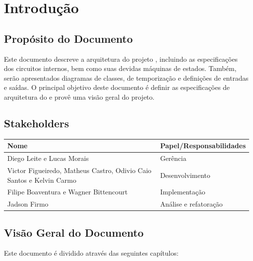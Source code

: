 \documentclass{report}
\begin{document}
\tableofcontents

\chapter{Introdução}
  
  \section{Propósito do Documento}
  Este documento descreve a arquitetura do projeto \ipPROCESSProject, incluindo as especificações dos circuitos internos, bem como suas devidas máquinas de estados. Também, serão apresentados diagramas de classes, de temporização e definições de entradas e saídas. O principal objetivo deste documento é definir as especificações de arquitetura do \ipPROCESSProject \space e provê uma visão geral do projeto.
  
  \section{Stakeholders}
    \FloatBarrier
    \begin{table}[H] 
      \begin{center}
        \begin{tabular}[pos]{|m{6cm} | m{8cm}|} 
          \hline 
          \cellcolor[gray]{0.9}\textbf{Nome} & \cellcolor[gray]{0.9}\textbf{Papel/Responsabilidades} \\ \hline
           Diego Leite e Lucas Morais & Gerência  \\ \hline
           Victor Figueiredo, Matheus Castro, Odivio Caio Santos e Kelvin Carmo & Desenvolvimento  \\ \hline
           Filipe Boaventura e Wagner Bittencourt & Implementação  \\ \hline
           Jadson Firmo & Análise e refatoração  \\ \hline
        \end{tabular}
      \end{center}
    \end{table} 

\section{Visão Geral do Documento}

Este documento é dividido através das seguintes capítulos:
\end{document}
